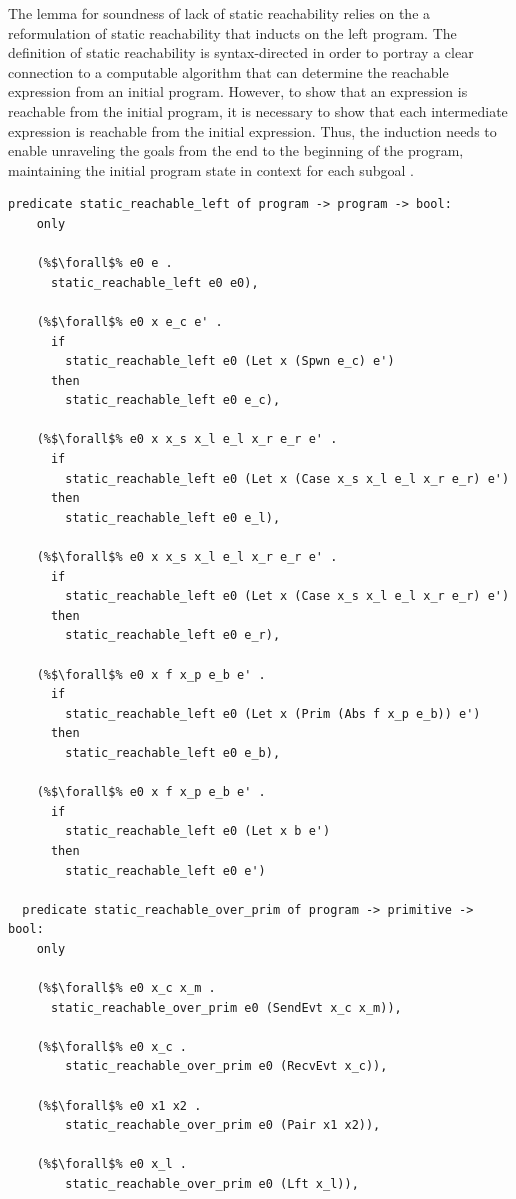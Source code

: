\documentclass{article}
\begin{document}
The lemma for soundness of lack of static reachability relies on the a reformulation of
static reachability that inducts on the left program.
The definition of static reachability is syntax-directed in
order to portray a clear connection to
a computable algorithm that can determine the reachable expression from an initial program.
However, to show that an expression is reachable from the initial program, it is necessary to
show that each intermediate expression is reachable from the initial expression.  Thus, the
induction needs to enable unraveling the goals from the end to the beginning of the program,
maintaining the initial program state in context for each subgoal .

\begin{lstlisting}[language=logic, escapechar=\%]
  predicate static_reachable_left of program -> program -> bool:
    only

    (%$\forall$% e0 e .
      static_reachable_left e0 e0),

    (%$\forall$% e0 x e_c e' .
      if 
        static_reachable_left e0 (Let x (Spwn e_c) e')
      then
        static_reachable_left e0 e_c),

    (%$\forall$% e0 x x_s x_l e_l x_r e_r e' .
      if
        static_reachable_left e0 (Let x (Case x_s x_l e_l x_r e_r) e')
      then
        static_reachable_left e0 e_l),

    (%$\forall$% e0 x x_s x_l e_l x_r e_r e' .
      if
        static_reachable_left e0 (Let x (Case x_s x_l e_l x_r e_r) e')
      then
        static_reachable_left e0 e_r),

    (%$\forall$% e0 x f x_p e_b e' .
      if
        static_reachable_left e0 (Let x (Prim (Abs f x_p e_b)) e')
      then
        static_reachable_left e0 e_b),

    (%$\forall$% e0 x f x_p e_b e' .
      if
        static_reachable_left e0 (Let x b e')
      then
        static_reachable_left e0 e')

  predicate static_reachable_over_prim of program -> primitive -> bool:
    only

    (%$\forall$% e0 x_c x_m .
      static_reachable_over_prim e0 (SendEvt x_c x_m)),

    (%$\forall$% e0 x_c .
        static_reachable_over_prim e0 (RecvEvt x_c)),

    (%$\forall$% e0 x1 x2 .
        static_reachable_over_prim e0 (Pair x1 x2)),

    (%$\forall$% e0 x_l .
        static_reachable_over_prim e0 (Lft x_l)),


\end{lstlisting}
\end{document}

